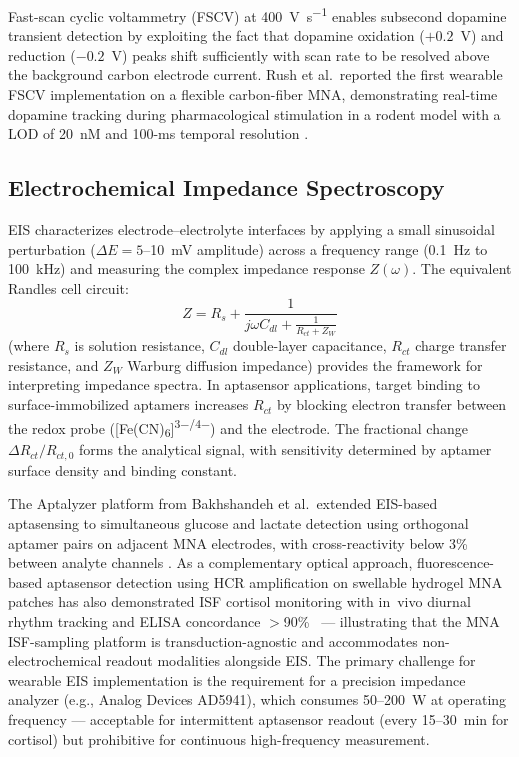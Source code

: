 \documentclass[review,1p]{elsarticle}
\begin{document}
Fast-scan cyclic voltammetry (FSCV) at 400~V~s\textsuperscript{$-1$} enables subsecond dopamine transient detection by exploiting the fact that dopamine oxidation ($+0.2$~V) and reduction ($-0.2$~V) peaks shift sufficiently with scan rate to be resolved above the background carbon electrode current. Rush et al.\ reported the first wearable FSCV implementation on a flexible carbon-fiber MNA, demonstrating real-time dopamine tracking during pharmacological stimulation in a rodent model with a LOD of 20~nM and 100-ms temporal resolution \cite{Rush2021FSCV}.

\subsection{Electrochemical Impedance Spectroscopy}
\label{subsec:eis}

EIS characterizes electrode--electrolyte interfaces by applying a small sinusoidal perturbation ($\Delta E = 5$--10~mV amplitude) across a frequency range (0.1~Hz to 100~kHz) and measuring the complex impedance response $Z(\omega)$. The equivalent Randles cell circuit:
\begin{equation}
Z = R_s + \frac{1}{j\omega C_{dl} + \frac{1}{R_{ct} + Z_W}}
\label{eq:eis_randles}
\end{equation}
(where $R_s$ is solution resistance, $C_{dl}$ double-layer capacitance, $R_{ct}$ charge transfer resistance, and $Z_W$ Warburg diffusion impedance) provides the framework for interpreting impedance spectra. In aptasensor applications, target binding to surface-immobilized aptamers increases $R_{ct}$ by blocking electron transfer between the redox probe ([Fe(CN)\textsubscript{6}]\textsuperscript{3$-$/4$-$}) and the electrode. The fractional change $\Delta R_{ct}/R_{ct,0}$ forms the analytical signal, with sensitivity determined by aptamer surface density and binding constant.

The Aptalyzer platform from Bakhshandeh et al.\ extended EIS-based aptasensing to simultaneous glucose and lactate detection using orthogonal aptamer pairs on adjacent MNA electrodes, with cross-reactivity below 3\% between analyte channels \cite{Bakhshandeh2024}. As a complementary optical approach, fluorescence-based aptasensor detection using HCR amplification on swellable hydrogel MNA patches has also demonstrated ISF cortisol monitoring with in~vivo diurnal rhythm tracking and ELISA concordance $>$90\%~\cite{Zhou2025Cortisol} — illustrating that the MNA ISF-sampling platform is transduction-agnostic and accommodates non-electrochemical readout modalities alongside EIS. The primary challenge for wearable EIS implementation is the requirement for a precision impedance analyzer (e.g., Analog Devices AD5941), which consumes 50--200~\textmu{}W at operating frequency — acceptable for intermittent aptasensor readout (every 15--30~min for cortisol) but prohibitive for continuous high-frequency measurement.
\end{document}
